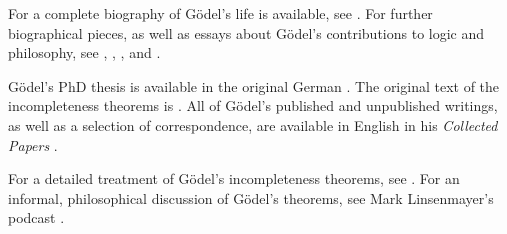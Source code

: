 \documentclass[../../../include/open-logic-section]{subfiles}
\begin{document}
\begin{reading}
For a complete biography of G{\"o}del's life is available, see
\citet{Dawson1997}. For further biographical pieces, as well as essays
about G{\"o}del's contributions to logic and philosophy, see
\citet{Wang1990}, \citet{Baaz2011}, \citet{Takeuti2003}, and
\citet{Sigmund2007}.

G{\"o}del's PhD thesis is available in the original German
\citep{Godel1929}.  The original text of the incompleteness theorems
is \citep{Godel1931}. All of G\"odel's published and unpublished
writings, as well as a selection of correspondence, are available in
English in his \emph{Collected Papers} \citet{Godel1986,Godel1990}.

For a detailed treatment of G{\"o}del's incompleteness theorems, see
\citet{Smith2013}. For an informal, philosophical discussion of
G{\"o}del's theorems, see Mark Linsenmayer's podcast
\citep{Linsenmayer2014}.
\end{reading}
\end{document}
